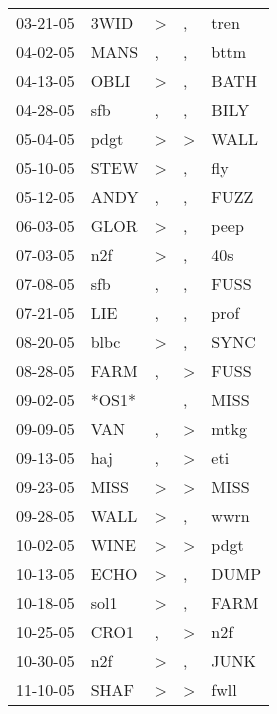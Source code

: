 \begin{supertabular}{lllll}
 03-21-05 &   3WID &     \textgreater &                , &   tren \\
 04-02-05 &   MANS &                , &                , &   bttm \\
 04-13-05 &   OBLI &     \textgreater &                , &   BATH \\
 04-28-05 &    sfb &                , &                , &   BILY \\
 05-04-05 &   pdgt &     \textgreater &     \textgreater &   WALL \\
 05-10-05 &   STEW &     \textgreater &                , &    fly \\
 05-12-05 &   ANDY &                , &                , &   FUZZ \\
 06-03-05 &   GLOR &     \textgreater &                , &   peep \\
 07-03-05 &    n2f &     \textgreater &                , &    40s \\
 07-08-05 &    sfb &                , &                , &   FUSS \\
 07-21-05 &    LIE &                , &                , &   prof \\
 08-20-05 &   blbc &     \textgreater &                , &   SYNC \\
 08-28-05 &   FARM &                , &     \textgreater &   FUSS \\
 09-02-05 &  *OS1* &                  &                , &   MISS \\
 09-09-05 &    VAN &                , &     \textgreater &   mtkg \\
 09-13-05 &    haj &                , &     \textgreater &    eti \\
 09-23-05 &   MISS &     \textgreater &     \textgreater &   MISS \\
 09-28-05 &   WALL &     \textgreater &                , &   wwrn \\
 10-02-05 &   WINE &     \textgreater &     \textgreater &   pdgt \\
 10-13-05 &   ECHO &     \textgreater &                , &   DUMP \\
 10-18-05 &   sol1 &     \textgreater &                , &   FARM \\
 10-25-05 &   CRO1 &                , &     \textgreater &    n2f \\
 10-30-05 &    n2f &     \textgreater &                , &   JUNK \\
 11-10-05 &   SHAF &     \textgreater &     \textgreater &   fwll \\

\end{supertabular}
